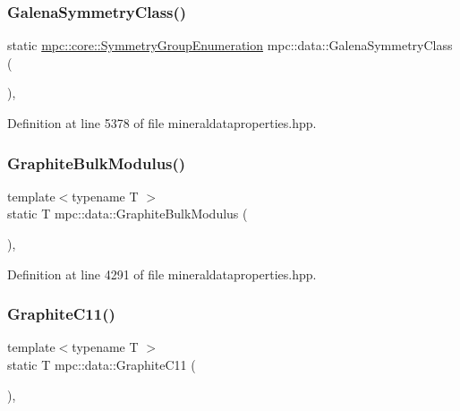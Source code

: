 \subsubsection{\texorpdfstring{Galena\+Symmetry\+Class()}{GalenaSymmetryClass()}}
{\footnotesize\ttfamily static \mbox{\hyperlink{namespacempc_1_1core_a9d979684062547055a0ef5c13077bad8}{mpc\+::core\+::\+Symmetry\+Group\+Enumeration}} mpc\+::data\+::\+Galena\+Symmetry\+Class (\begin{DoxyParamCaption}{ }\end{DoxyParamCaption})\hspace{0.3cm}{\ttfamily [inline]}, {\ttfamily [static]}}



Definition at line 5378 of file mineraldataproperties.\+hpp.

\mbox{\label{namespacempc_1_1data_a8d3fe38b39965b0531fca845efc473a1}} 
\subsubsection{\texorpdfstring{Graphite\+Bulk\+Modulus()}{GraphiteBulkModulus()}}
{\footnotesize\ttfamily template$<$typename T $>$ \\
static T mpc\+::data\+::\+Graphite\+Bulk\+Modulus (\begin{DoxyParamCaption}{ }\end{DoxyParamCaption})\hspace{0.3cm}{\ttfamily [inline]}, {\ttfamily [static]}}



Definition at line 4291 of file mineraldataproperties.\+hpp.

\mbox{\label{namespacempc_1_1data_a81cbaf579766460ce33ed545dedd8f97}} 
\subsubsection{\texorpdfstring{Graphite\+C11()}{GraphiteC11()}}
{\footnotesize\ttfamily template$<$typename T $>$ \\
static T mpc\+::data\+::\+Graphite\+C11 (\begin{DoxyParamCaption}{ }\end{DoxyParamCaption})\hspace{0.3cm}{\ttfamily [inline]}, {\ttfamily [static]}}



